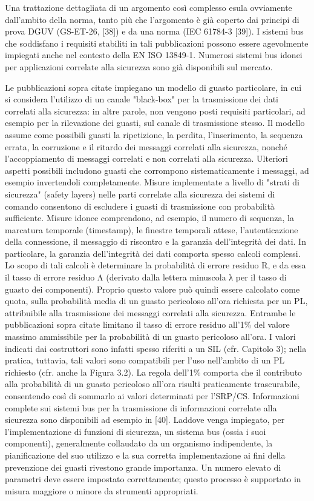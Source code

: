 Una trattazione dettagliata di un argomento così complesso esula ovviamente dall'ambito della norma, tanto più che l'argomento è già coperto dai principi di prova DGUV (GS-ET-26, [38]) e da una norma (IEC 61784-3 [39]). I sistemi bus che soddisfano i requisiti stabiliti in tali pubblicazioni possono essere agevolmente impiegati anche nel contesto della EN ISO 13849-1. Numerosi sistemi bus idonei per applicazioni correlate alla sicurezza sono già disponibili sul mercato.

Le pubblicazioni sopra citate impiegano un modello di guasto particolare, in cui si considera l'utilizzo di un canale "black-box" per la trasmissione dei dati correlati alla sicurezza: in altre parole, non vengono posti requisiti particolari, ad esempio per la rilevazione dei guasti, sul canale di trasmissione stesso. Il modello assume come possibili guasti la ripetizione, la perdita, l'inserimento, la sequenza errata, la corruzione e il ritardo dei messaggi correlati alla sicurezza, nonché l'accoppiamento di messaggi correlati e non correlati alla sicurezza. Ulteriori aspetti possibili includono guasti che corrompono sistematicamente i messaggi, ad esempio invertendoli completamente. Misure implementate a livello di "strati di sicurezza" (safety layers) nelle parti correlate alla sicurezza dei sistemi di comando consentono di escludere i guasti di trasmissione con probabilità sufficiente. Misure idonee comprendono, ad esempio, il numero di sequenza, la marcatura temporale (timestamp), le finestre temporali attese, l'autenticazione della connessione, il messaggio di riscontro e la garanzia dell'integrità dei dati. In particolare, la garanzia dell'integrità dei dati comporta spesso calcoli complessi. Lo scopo di tali calcoli è determinare la probabilità di errore residuo R, e da essa il tasso di errore residuo Λ (derivato dalla lettera minuscola λ per il tasso di guasto dei componenti). Proprio questo valore può quindi essere calcolato come quota, sulla probabilità media di un guasto pericoloso all'ora richiesta per un PL, attribuibile alla trasmissione dei messaggi correlati alla sicurezza. Entrambe le pubblicazioni sopra citate limitano il tasso di errore residuo all'1\% del valore massimo ammissibile per la probabilità di un guasto pericoloso all'ora. I valori indicati dai costruttori sono infatti spesso riferiti a un SIL (cfr. Capitolo 3); nella pratica, tuttavia, tali valori sono compatibili per l'uso nell'ambito di un PL richiesto (cfr. anche la Figura 3.2). La regola dell'1\% comporta che il contributo alla probabilità di un guasto pericoloso all'ora risulti praticamente trascurabile, consentendo così di sommarlo ai valori determinati per l'SRP/CS. Informazioni complete sui sistemi bus per la trasmissione di informazioni correlate alla sicurezza sono disponibili ad esempio in [40].
Laddove venga impiegato, per l'implementazione di funzioni di sicurezza, un sistema bus (ossia i suoi componenti), generalmente collaudato da un organismo indipendente, la pianificazione del suo utilizzo e la sua corretta implementazione ai fini della prevenzione dei guasti rivestono grande importanza. Un numero elevato di parametri deve essere impostato correttamente; questo processo è supportato in misura maggiore o minore da strumenti appropriati.


